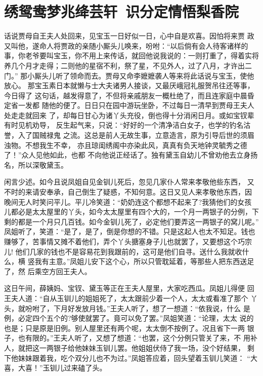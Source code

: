 \chapter{绣鸳鸯梦兆绛芸轩~识分定情悟梨香院}

话说贾母自王夫人处回来，见宝玉一日好似一日，心中自是欢喜。因怕将来贾
政又叫他，遂命人将贾政的亲随小厮头儿唤来，吩咐：“以后倘有会人待客诸样的
事，你老爷要叫宝玉，你不用上来传话，就回他说我说的：一则打重了，得着实将
养几个月才走得；二则他的星宿不利，祭了星，不见外人，过了八月，才许出二门。”
那小厮头儿听了领命而去。贾母又命李嬷嬷袭人等来将此话说与宝玉，使他放心。
那宝玉素日本就懒与士大夫诸男人接谈，又最厌峨冠礼服贺吊往还等事，今日得了
这句话，越发得意了，不但将亲戚朋友一概杜绝了，而且连家庭中晨昏定省一发都
随他的便了。日日只在园中游玩坐卧，不过每日一清早到贾母王夫人处走走就回来
了，却每日甘心为诸丫头充役，倒也得十分消闲日月。或如宝钗辈有时见机劝导，
反生起气来，只说：“好好的一个清净洁白女子，也学的钓名沽誉，入了国贼禄鬼
之流。这总是前人无故生事，立意造言，原为引导后世的须眉浊物。不想我生不幸，
亦且琼闺绣阁中亦染此风，真真有负天地钟灵毓秀之德了！”众人见他如此，也都
不向他说正经话了。独有黛玉自幼儿不曾劝他去立身扬名，所以深敬黛玉。

闲言少述。如今且说凤姐自见金钏儿死后，忽见几家仆人常来孝敬他些东西，
又不时的来请安奉承，自己倒生了疑惑，不知何意。这日又见人来孝敬他东西，因
晚间无人时笑问平儿。平儿冷笑道：“奶奶连这个都想不起来了?我猜他们的女孩
儿都必是太太屋里的丫头，如今太太屋里有四个大的，一个月一两银子的分例，下
剩的都是一个月只几百钱。如今金钏儿死了，必定他们要弄这一两银子的窝儿呢。”
凤姐听了，笑道：“是了，是了，倒是你想的不错。只是这起人也太不知足。钱也
赚够了，苦事情又摊不着他们，弄个丫头搪塞身子儿也就罢了，又要想这个巧宗儿!
他们几家的钱也不是容易花到我跟前的，这可是他们自寻。送什么我就收什么，横
竖我有主意。”凤姐儿安下这个心，所以只管耽延着，等那些人把东西送足了，然
后乘空方回王夫人。

这日午间，薛姨妈、宝钗、黛玉等正在王夫人屋里，大家吃西瓜。凤姐儿得便
回王夫人道：“自从玉钏儿的姐姐死了，太太跟前少着一个人，太太或看准了那个
丫头，就吩咐了，下月好发放月钱。”王夫人听了，想了一想道：“依我说，什么
是例，必定四个五个的?够使就罢了。竟可以免了罢。”凤姐笑道：“论理，太太
说的也是；只是原是旧例。别人屋里还有两个呢，太太倒不按例了。况且省下一两
银子，也有限的。”王夫人听了，又想了想道：“也罢，这个分例只管关了来，不
用补人，就把这一两银子给他妹妹玉钏儿罢。他姐姐伏侍了我一场，没个好结果，
剩下他妹妹跟着我，吃个双分儿也不为过。”凤姐答应着，回头望着玉钏儿笑道：
“大喜，大喜！”玉钏儿过来磕了头。

